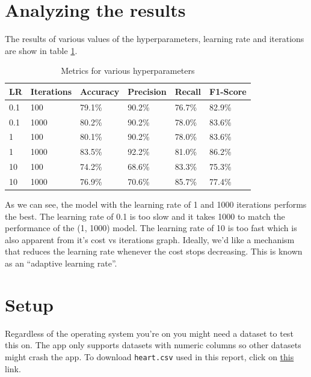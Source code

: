 \documentclass[12pt, a4]{article}
\begin{document}
\section{Analyzing the results}

The results of various values of the hyperparameters, learning rate and
iterations are show in table \ref{table:hyperparams}.

\begin{table}[h]
  \centering
  \begin{tabular}{| p{2cm} | p{2cm} || p{2cm} | p{2cm} | p{2cm} | p{2cm} |}
    \hline
    LR & Iterations & Accuracy & Precision & Recall & F1-Score \\
    \hline
    0.1 & 100  & 79.1\% & 90.2\% & 76.7\% & 82.9\%  \\
    0.1 & 1000 & 80.2\% & 90.2\% & 78.0\% & 83.6\%  \\
    1   & 100  & 80.1\% & 90.2\% & 78.0\% & 83.6\%  \\
    1   & 1000 & 83.5\% & 92.2\% & 81.0\% & 86.2\%  \\
    10  & 100  & 74.2\% & 68.6\% & 83.3\% & 75.3\%  \\
    10  & 1000 & 76.9\% & 70.6\% & 85.7\% & 77.4\%  \\
    \hline
  \end{tabular}
\caption{Metrics for various hyperparameters}
\label{table:hyperparams}
\end{table}

As we can see, the model with the learning rate of 1 and 1000 iterations
performs the best. The learning rate of 0.1 is too slow and it takes 1000 to
match the performance of the (1, 1000) model. The learning rate of 10 is too
fast which is also apparent from it's cost vs iterations graph. Ideally, we'd
like a mechanism that reduces the learning rate whenever the cost stops
decreasing. This is known as an ``adaptive learning rate''.

\section{Setup}

Regardless of the operating system you're on you might need a dataset to test
this on. The app only supports datasets with numeric columns so other datasets
might crash the app. To download \texttt{heart.csv} used in this report, click
on
\href{https://downgit.github.io/#/home?url=https://github.com/ArchitBhonsle/gtk-rs-experiment/blob/main/data/heart.csv}{this} link.
\end{document}
